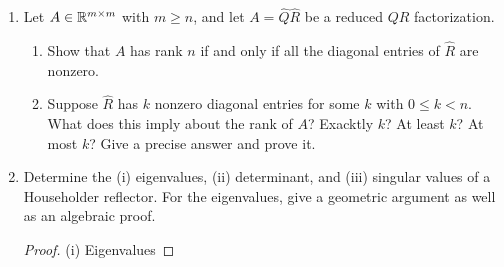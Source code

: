 \documentclass{article}
\begin{document}
\begin{enumerate}
\begin{enumerate}
\begin{proof}
            Next we look at the eigenvalues of $P$. Say that we have an arbitary eigenvalue-eigenvector pair ($\lambda, v$) for $P$ such that $v \neq \vec{0}$ (obviously). We have,
            \[
                Pv = \lambda v
            \]
            \[
                Pv = xx^Tv = (x, v)x = \lambda v
            \]
            Notice that $(x, v)$ and $\lambda$ are scalars. This implies that $x$ and $v$ are colinear but this was not an assumption made. Therefore we are left with two cases: $v$ and $x$ are colinear, or $v$ and $x$ are orthogonal. Let's look at the first case, $v = \alpha x$.
            \[
                (x, v)x = \alpha x = \alpha\lambda x
            \] 
            \[
                x = \lambda x \implies \lambda = 1
            \]
            We find that for all vectors colinear to $x$ are eigenvectors with eigenvalue 1. We look at the other case. If $x$ and $v$ are orthogonal we have $(x, v) = 0$. 
            \[
                \vec{0} = \lambda v \implies \lambda = 0
            \]
            Therefore all vectors orthogonal to $x$ will be eigenvectors with $\lambda = 0$. 
        \end{proof}
\end{enumerate}

\item   %
Let $A \in \mathbb{R}^{m \times m}$ with $m \ge n$, and let $A = \hat{Q}\hat{R}$ be a reduced $QR$ factorization. 

\begin{enumerate}
\item Show that $A$ has rank $n$ if and only if all the diagonal entries of $\hat{R}$ are nonzero.

\item Suppose $\hat{R}$ has $k$ nonzero diagonal entries for some $k$ with $0 \le k < n$. What does this imply about the rank of $A$? Exacktly $k$? At least $k$? At most $k$? Give a precise answer and prove it.
\end{enumerate}


\item %
Determine the (i) eigenvalues, (ii) determinant, and (iii) singular values of a Householder reflector. For the eigenvalues, give a geometric argument as well as an algebraic proof. 

\begin{proof}
    (i) Eigenvalues 


\end{proof}
\end{enumerate}
\end{document}
